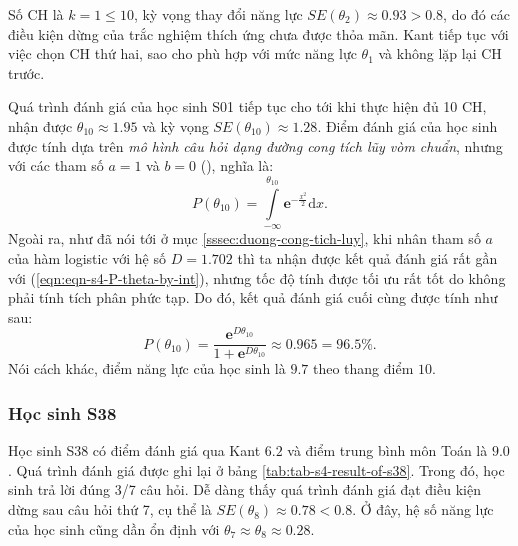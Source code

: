 Số CH là $k=1\leqslant 10$, kỳ vọng thay đổi năng lực $SE(\theta_2)\approx 0.93>0.8$, do đó các điều kiện dừng của trắc nghiệm thích ứng chưa được thỏa mãn. Kant tiếp tục với việc chọn CH thứ hai, sao cho phù hợp với mức năng lực $\theta_1$ và không lặp lại CH trước.\par
Quá trình đánh giá của học sinh S01 tiếp tục cho tới khi thực hiện đủ 10 CH, nhận được $\theta_{10}\approx 1.95$ và kỳ vọng $SE(\theta_{10})\approx 1.28$. Điểm đánh giá của học sinh được tính dựa trên \textit{mô hình câu hỏi dạng đường cong tích lũy vòm chuẩn}, nhưng với các tham số $a=1$ và $b=0$ (\cite{le2019phat}), nghĩa là: \begin{equation}\label{eqn:eqn-s4-P-theta-by-int}P(\theta_{10})=\int\limits_{-\infty}^{\theta_{10}}\mathbf{e}^{-\frac{x^2}{2}}\mathrm{d}x.\end{equation}
Ngoài ra, như đã nói tới ở mục \ref{sssec:duong-cong-tich-luy}, khi nhân tham số $a$ của hàm logistic với hệ số $D=1.702$ thì ta nhận được kết quả đánh giá rất gần với (\ref{eqn:eqn-s4-P-theta-by-int}), nhưng tốc độ tính được tối ưu rất tốt do không phải tính tích phân phức tạp. Do đó, kết quả đánh giá cuối cùng được tính như sau: $$P(\theta_{10})=\frac{\mathbf{e}^{D\theta_{10}}}{1+\mathbf{e}^{D\theta_{10}}}\approx 0.965=96.5\%.$$
Nói cách khác, điểm năng lực của học sinh là $9.7$ theo thang điểm $10$.

\subsubsection{Học sinh S38}

Học sinh S38 có điểm đánh giá qua Kant $6.2$ và điểm trung bình môn Toán là $9.0$. Quá trình đánh giá được ghi lại ở bảng \ref{tab:tab-s4-result-of-s38}. Trong đó, học sinh trả lời đúng 3/7 câu hỏi. Dễ dàng thấy quá trình đánh giá đạt điều kiện dừng sau câu hỏi thứ 7, cụ thể là $SE(\theta_8)\approx 0.78<0.8$. Ở đây, hệ số năng lực của học sinh cũng dần ổn định với $\theta_7\approx\theta_8\approx 0.28$.

